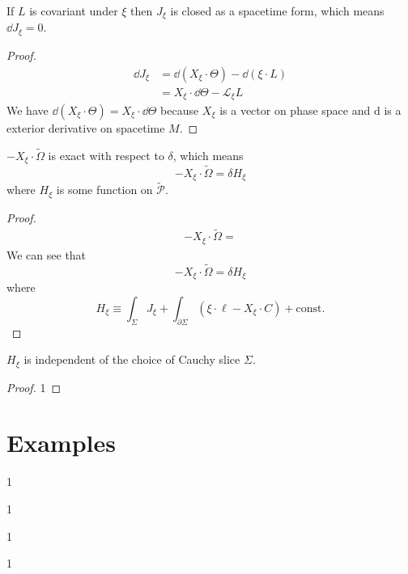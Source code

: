 \documentclass[10pt]{article}
\begin{document}
\begin{claim}
    If $L$ is covariant under $\xi$ then $J_{\xi}$ is closed as a spacetime form, which means $\dd{J_\xi}=0$.
\end{claim}
\begin{proof}
    \begin{equation}
        \begin{split}
            \dd{J_\xi}&=\dd{(X_\xi\cdot\Theta)}-\dd{(\xi\cdot L)}\\
                      &=X_\xi\cdot\dd{\Theta}-\mathcal{L}_\xi L
        \end{split}
    \end{equation}
    We have $\dd{(X_\xi\cdot\Theta)}=X_\xi\cdot\dd{\Theta}$ because $X_\xi$ is a vector on phase space and $\mathrm{d}$ is a exterior derivative on spacetime $M$.
\end{proof}


\begin{claim}
    $-X_\xi\cdot\tilde{\Omega}$ is exact with respect to $\delta$, which means
    \begin{equation}
        -X_\xi\cdot\tilde{\Omega}=\delta H_{\xi}
    \end{equation}
    where $H_{\xi}$ is some function on $\tilde{\mathcal{P}}$.
\end{claim}
\begin{proof}
    \begin{equation}
        \begin{split}
            -X_\xi\cdot\tilde{\Omega}=
        \end{split}
    \end{equation}
    We can see that
    \begin{equation}
        -X_\xi\cdot\tilde{\Omega}=\delta H_\xi
    \end{equation}
    where
    \begin{equation}
        H_\xi\equiv\int_{\Sigma}J_{\xi}+\int_{\partial\Sigma}(\xi\cdot\ell-X_\xi\cdot C)+\text{const.}
    \end{equation}

\end{proof}

\begin{claim}
    $H_\xi$ is independent of the choice of Cauchy slice $\Sigma$.
\end{claim}
\begin{proof}
    1
\end{proof}

\section{Examples}
\begin{example}
    1
\end{example}

\begin{example}
    1
\end{example}

\begin{example}
    1
\end{example}

\begin{example}
    1
\end{example}

\clearpage


\end{document}
